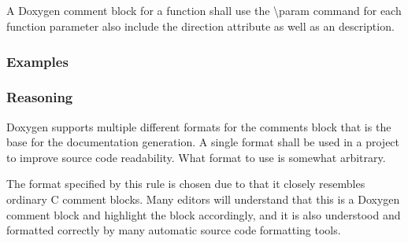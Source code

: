 \subsection*{\doxygenRule{}}

A Doxygen comment block for a function shall use the \textbackslash param command for each function parameter also include the direction attribute as well as an description.

\subsubsection*{Examples}

\noindent
\begin{minipage}[t]{0.47\textwidth}
    
     
    
\end{minipage}\hfill
\begin{minipage}[t]{0.47\textwidth}
    
\end{minipage}


\subsubsection*{Reasoning}

Doxygen supports multiple different formats for the comments block that is the base for the documentation generation. A single format shall be used in a project to improve source code readability. What format to use is somewhat arbitrary.

The format specified by this rule is chosen due to that it closely resembles ordinary C comment blocks. Many editors will understand that this is a Doxygen comment block and highlight the block accordingly, and it is also understood and formatted correctly by many automatic source code formatting tools.

